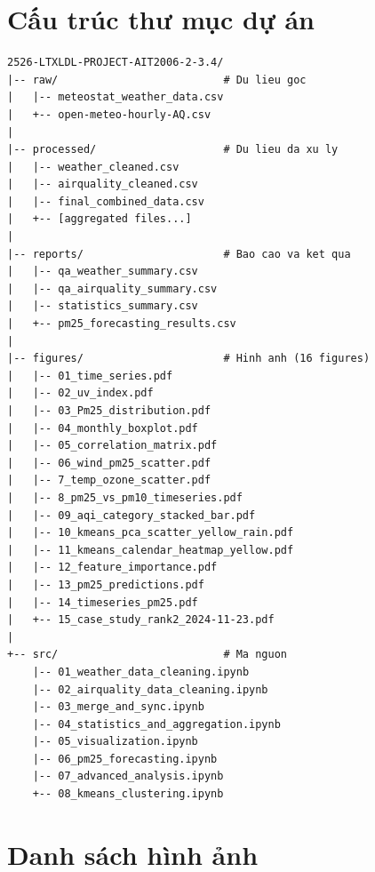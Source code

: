 \documentclass[12pt,a4paper]{article}
\begin{document}
\appendix
\section{Cấu trúc thư mục dự án}

\begin{verbatim}
2526-LTXLDL-PROJECT-AIT2006-2-3.4/
|-- raw/                          # Du lieu goc
|   |-- meteostat_weather_data.csv
|   +-- open-meteo-hourly-AQ.csv
|
|-- processed/                    # Du lieu da xu ly
|   |-- weather_cleaned.csv
|   |-- airquality_cleaned.csv
|   |-- final_combined_data.csv
|   +-- [aggregated files...]
|
|-- reports/                      # Bao cao va ket qua
|   |-- qa_weather_summary.csv
|   |-- qa_airquality_summary.csv
|   |-- statistics_summary.csv
|   +-- pm25_forecasting_results.csv
|
|-- figures/                      # Hinh anh (16 figures)
|   |-- 01_time_series.pdf
|   |-- 02_uv_index.pdf
|   |-- 03_Pm25_distribution.pdf
|   |-- 04_monthly_boxplot.pdf
|   |-- 05_correlation_matrix.pdf
|   |-- 06_wind_pm25_scatter.pdf
|   |-- 7_temp_ozone_scatter.pdf
|   |-- 8_pm25_vs_pm10_timeseries.pdf
|   |-- 09_aqi_category_stacked_bar.pdf
|   |-- 10_kmeans_pca_scatter_yellow_rain.pdf
|   |-- 11_kmeans_calendar_heatmap_yellow.pdf
|   |-- 12_feature_importance.pdf
|   |-- 13_pm25_predictions.pdf
|   |-- 14_timeseries_pm25.pdf
|   +-- 15_case_study_rank2_2024-11-23.pdf
|
+-- src/                          # Ma nguon
    |-- 01_weather_data_cleaning.ipynb
    |-- 02_airquality_data_cleaning.ipynb
    |-- 03_merge_and_sync.ipynb
    |-- 04_statistics_and_aggregation.ipynb
    |-- 05_visualization.ipynb
    |-- 06_pm25_forecasting.ipynb
    |-- 07_advanced_analysis.ipynb
    +-- 08_kmeans_clustering.ipynb
\end{verbatim}

\section{Danh sách hình ảnh}
\end{document}
